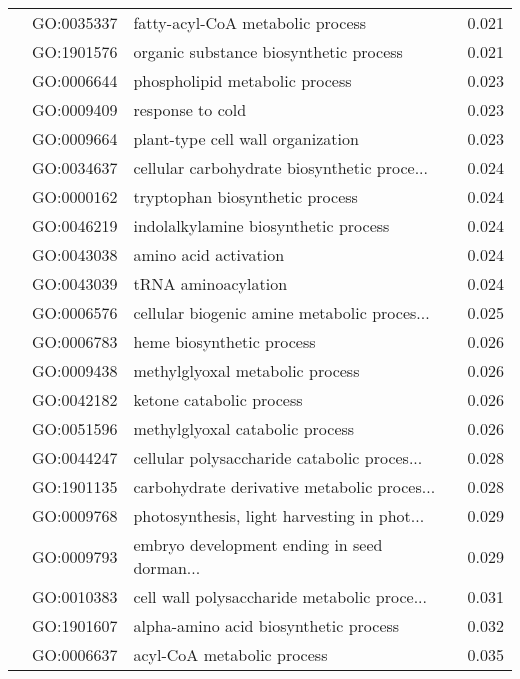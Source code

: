 \begin{longtable}{lllr}
   & GO:0035337 &             fatty-acyl-CoA metabolic process &         0.021 \\
   & GO:1901576 &       organic substance biosynthetic process &         0.021 \\
   & GO:0006644 &               phospholipid metabolic process &         0.023 \\
   & GO:0009409 &                             response to cold &         0.023 \\
   & GO:0009664 &            plant-type cell wall organization &         0.023 \\
   & GO:0034637 &  cellular carbohydrate biosynthetic proce... &         0.024 \\
   & GO:0000162 &              tryptophan biosynthetic process &         0.024 \\
   & GO:0046219 &         indolalkylamine biosynthetic process &         0.024 \\
   & GO:0043038 &                        amino acid activation &         0.024 \\
   & GO:0043039 &                          tRNA aminoacylation &         0.024 \\
   & GO:0006576 &  cellular biogenic amine metabolic proces... &         0.025 \\
   & GO:0006783 &                    heme biosynthetic process &         0.026 \\
   & GO:0009438 &              methylglyoxal metabolic process &         0.026 \\
   & GO:0042182 &                     ketone catabolic process &         0.026 \\
   & GO:0051596 &              methylglyoxal catabolic process &         0.026 \\
   & GO:0044247 &  cellular polysaccharide catabolic proces... &         0.028 \\
   & GO:1901135 &  carbohydrate derivative metabolic proces... &         0.028 \\
   & GO:0009768 &  photosynthesis, light harvesting in phot... &         0.029 \\
   & GO:0009793 &  embryo development ending in seed dorman... &         0.029 \\
   & GO:0010383 &  cell wall polysaccharide metabolic proce... &         0.031 \\
   & GO:1901607 &        alpha-amino acid biosynthetic process &         0.032 \\
   & GO:0006637 &                   acyl-CoA metabolic process &         0.035 \\

\end{longtable}
